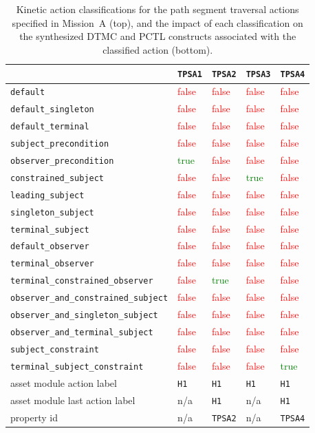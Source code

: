 \newcommand{\true}{\textcolor{green}{true}}
\newcommand{\false}{\textcolor{red}{false}}

\begin{table}[ht]
	\renewcommand*\arraystretch{1.3}
	\begin{tabularx}{\textwidth}{
			>{\raggedright\hsize=0.56\hsize}X|
			>{\centering\hsize=0.11\hsize}X
			>{\centering\hsize=0.11\hsize}X
			>{\centering\hsize=0.11\hsize}X
			>{\centering\hsize=0.11\hsize}X
		}
		& \texttt{TPSA1} & \texttt{TPSA2} & \texttt{TPSA3} & \texttt{TPSA4}\tabularnewline
		\hline
		\texttt{default} & \false & \false & \false & \false\tabularnewline
		\texttt{default\_singleton} & \false & \false & \false & \false\tabularnewline
		\texttt{default\_terminal} & \false & \false & \false & \false\tabularnewline
		\texttt{subject\_precondition} & \false & \false & \false & \false\tabularnewline
		\texttt{observer\_precondition} & \true & \false & \false & \false\tabularnewline
		\texttt{constrained\_subject} & \false & \false & \true & \false\tabularnewline
		\texttt{leading\_subject} & \false & \false & \false & \false\tabularnewline
		\texttt{singleton\_subject} & \false & \false & \false & \false\tabularnewline
		\texttt{terminal\_subject} & \false & \false & \false & \false\tabularnewline
		\texttt{default\_observer} & \false & \false & \false & \false\tabularnewline
		\texttt{terminal\_observer} & \false & \false & \false & \false\tabularnewline
		\texttt{terminal\_constrained\_observer} & \false & \true & \false & \false\tabularnewline
		\texttt{observer\_and\_constrained\_subject} & \false & \false & \false & \false\tabularnewline
		\texttt{observer\_and\_singleton\_subject} & \false & \false & \false & \false\tabularnewline
		\texttt{observer\_and\_terminal\_subject} & \false & \false & \false & \false\tabularnewline
		\texttt{subject\_constraint} & \false & \false & \false & \false\tabularnewline
		\texttt{terminal\_subject\_constraint} & \false & \false & \false & \true\tabularnewline
		\hline\hline
		asset module action label & \texttt{H1} & \texttt{H1} & \texttt{H1} & \texttt{H1}\tabularnewline
		asset module last action label & n/a & \texttt{H1} & n/a & \texttt{H1}\tabularnewline
		property id & n/a & \texttt{TPSA2} & n/a & \texttt{TPSA4}\tabularnewline
	\end{tabularx}
	\caption[Kinetic action classifications for Mission~A]{Kinetic action classifications for the path segment traversal actions specified in Mission~A (top), and the impact of each classification on the synthesized DTMC and PCTL constructs associated with the classified action (bottom).}
	\label{tab:Mission_A_classifications}
\end{table}

